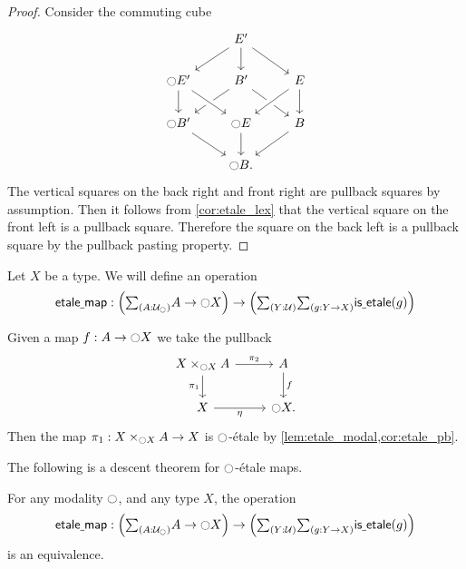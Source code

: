 \documentclass[9pt,twosided]{amsart}
\begin{document}
\begin{proof}
Consider the commuting cube
\begin{equation*}
\begin{tikzcd}
&[-.5ex] E' \arrow[dr] \arrow[d] \arrow[dl] \\
\modal E' \arrow[d] & B' \arrow[dl] \arrow[dr] & E \arrow[dl,crossing over] \arrow[d] \\
\modal B' \arrow[dr] & \modal E \arrow[d] \arrow[from=ul,crossing over] & B \arrow[dl] \\
& \modal B.
\end{tikzcd}
\end{equation*}
The vertical squares on the back right and front right are pullback squares by assumption.
Then it follows from \cref{cor:etale_lex} that the vertical square on the front left is a pullback square.
Therefore the square on the back left is a pullback square by the pullback pasting property.
\end{proof}

\begin{defn}
Let $X$ be a type. We will define an operation
\begin{equation*}
\etmap:\Big(\sm{A:\UU_\modal}A\to\modal X\Big)\to\Big(\sm{Y:\UU}{g:Y\to X}\isetale(g)\Big)
\end{equation*}
\end{defn}

\begin{constr}
Given a map $f:A\to {\ensuremath{\ocircle}} X$ we take the pullback
\begin{equation*}
\begin{tikzcd}
X\times_{\modal X}A \arrow[d,swap,"\pi_1"] \arrow[r,"\pi_2"] & A \arrow[d,"f"] \\
X \arrow[r,swap,"\modalunit"] & \modal X.
\end{tikzcd}
\end{equation*}
Then the map $\pi_1:X\times_{{\ocircle} X}A\to X$ is ${\ocircle}$-\'etale by \cref{lem:etale_modal,cor:etale_pb}.
\end{constr}

The following is a descent theorem for ${\ocircle}$-\'etale maps.

\begin{thm}
For any modality ${\ocircle}$, and any type $X$, the operation
\begin{equation*}
\etmap:\Big(\sm{A:\UU_\modal}A\to\modal X\Big)\to\Big(\sm{Y:\UU}{g:Y\to X}\isetale(g)\Big)
\end{equation*}
is an equivalence.
\end{thm}
\end{document}
